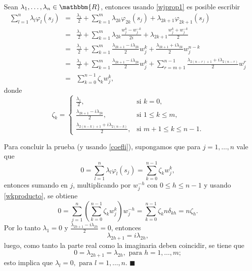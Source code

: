 \documentclass[a4paper,10pt]{book}
\newcommand{\R}{\mathbbm{R}}
\newenvironment{dem}{\vspace*{-0.1cm}{\it Demostraci\'on:}}{\hfill
$\blacksquare$\\}
\begin{document}
\begin{dem}
Sean $\lambda_1,\ldots,\lambda_n\in\R$, entonces usando \eqref{wjprop1} es posible escribir
\begin{equation}\label{coefli}
    \begin{array}{rcl}
    \displaystyle\sum_{l=1}^n\lambda_l\varphi_l(s_j)&=&\frac{\lambda_1}{2}+\displaystyle\sum_{k=1}^m\lambda_{2k}\varphi_{2k}(s_j)+\lambda_{2k+1}\varphi_{2k+1}(s_j)\\
     &=&\frac{\lambda_1}{2}+\displaystyle\sum_{k=1}^m\lambda_{2k}\frac{w_j^k-w_j^{-k}}{2i}+\lambda_{2k+1}\frac{w_j^k+w_j^{-k}}{2}\\
     &=&\frac{\lambda_1}{2}+\displaystyle\sum_{k=1}^m\frac{\lambda_{2k+1}-i\lambda_{2k}}{2}w_j^k+\frac{\lambda_{2k+1}+i\lambda_{2k}}{2}w_j^{n-k}\\
     &=&\frac{\lambda_1}{2}+\displaystyle\sum_{k=1}^m\frac{\lambda_{2k+1}-i\lambda_{2k}}{2}w_j^k+\displaystyle\sum_{r=m+1}^{n-1}\frac{\lambda_{2(n-r)+1}+i\lambda_{2(n-r)}}{2}w_j^r\\
     &=&\displaystyle\sum_{k=0}^{n-1}\zeta_kw_j^k,
    \end{array}
\end{equation}
donde
\begin{equation*}
\zeta_k=\left\{\begin{array}{cl}
    \frac{\lambda_1}{2},& \mbox{si }k=0,\\
    \frac{\lambda_{2k+1}-i\lambda_{2k}}{2},&\mbox{si }1\leq k \leq m,\\
    \frac{\lambda_{2(n-k)+1}+i\lambda_{2(n-k)}}{2},&\mbox{si }m+1\leq k\leq n-1.
    \end{array}\right.
\end{equation*}

Para concluir la prueba (y usando \eqref{coefli}), supongamos que para $j=1,\ldots,n$ vale que
$$0=\displaystyle\sum_{l=1}^n\lambda_l\varphi_l(s_j)=\displaystyle\sum_{k=0}^{n-1}\zeta_kw_j^k,$$
entonces sumando en $j$, multiplicando por $w_j^{-h}$ con $0\leq h\leq n-1$ y usando \eqref{wkproducto}, se obtiene
\begin{equation*}
    0=\displaystyle\sum_{j=1}^n\left(\displaystyle\sum_{k=0}^{n-1}\zeta_kw_j^k\right)w_j^{-h}=\displaystyle\sum_{k=0}^{n-1}\zeta_kn\delta_{kh}=n\zeta_h.
\end{equation*}
Por lo tanto $\lambda_1=0$ y $\frac{\lambda_{2h+1}-i\lambda_{2h}}{2}=0$, entonces $$\lambda_{2h+1}=i\lambda_{2h},$$
luego, como tanto la parte real como la imaginaria deben coincidir, se tiene que $$0=\lambda_{2h+1}=\lambda_{2h},\mbox{ para }h=1,\ldots,m;$$
esto implica que $\lambda_l=0, \mbox{ para }l=1,\ldots,n$.
\end{dem}
\end{document}
